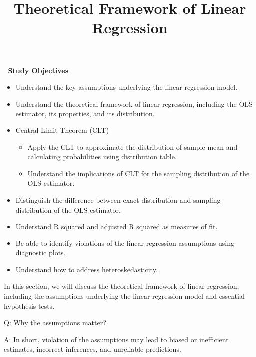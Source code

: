 \documentclass[
  12pt,
]{scrbook}
\title{Theoretical Framework of Linear Regression}
\author{}
\date{}
\providecommand{\tightlist}{%
  \setlength{\itemsep}{0pt}\setlength{\parskip}{0pt}}
\renewcommand{\tightlist}{\setlength{\itemsep}{0.5\baselineskip}\setlength{\parskip}{0.2\baselineskip}}
\theoremstyle{plain}
\theoremstyle{definition}
\theoremstyle{remark}
\begin{document}
\frontmatter
\maketitle


\mainmatter
\begin{tcolorbox}[enhanced jigsaw, colback=white, colframe=quarto-callout-note-color-frame, leftrule=.75mm, bottomrule=.15mm, opacityback=0, rightrule=.15mm, arc=.35mm, toprule=.15mm, breakable, left=2mm]

🎯 \textbf{Study Objectives}

\begin{itemize}
\tightlist
\item
  Understand the key assumptions underlying the linear regression model.
\item
  Understand the theoretical framework of linear regression, including
  the OLS estimator, its properties, and its distribution.
\item
  Central Limit Theorem (CLT)

  \begin{itemize}
  \tightlist
  \item
    Apply the CLT to approximate the distribution of sample mean and
    calculating probabilities using distribution table.
  \item
    Understand the implications of CLT for the sampling distribution of
    the OLS estimator.
  \end{itemize}
\item
  Distinguish the difference between exact distribution and sampling
  distribution of the OLS estimator.
\item
  Understand R squared and adjusted R squared as measures of fit.
\item
  Be able to identify violations of the linear regression assumptions
  using diagnostic plots.
\item
  Understand how to address heteroskedasticity.
\end{itemize}

\end{tcolorbox}

In this section, we will discuss the theoretical framework of linear
regression, including the assumptions underlying the linear regression
model and essential hypothesis tests.

Q: Why the assumptions matter?

A: In short, violation of the assumptions may lead to biased or
inefficient estimates, incorrect inferences, and unreliable predictions.
\end{document}
